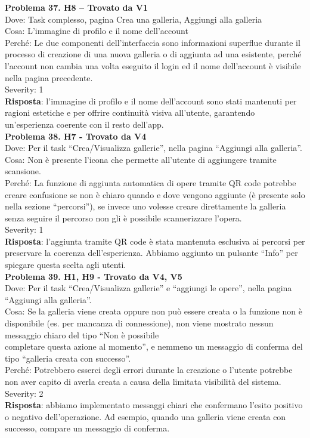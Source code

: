 \documentclass{article}
\begin{document}
\noindent \textbf{Problema 37. H8 – Trovato da V1} \\
Dove: Task complesso, pagina Crea una galleria, Aggiungi alla galleria \\
Cosa: L’immagine di profilo e il nome dell’account \\
Perché: Le due componenti dell’interfaccia sono informazioni superflue durante il processo di creazione di una nuova galleria o di aggiunta ad una esistente, perché l’account non cambia una volta eseguito il login ed il nome dell'account è visibile nella pagina precedente. \\
Severity: 1 \\
\textbf{Risposta}: l’immagine di profilo e il nome dell’account sono stati mantenuti per ragioni estetiche e per offrire continuità visiva all’utente, garantendo un’esperienza coerente con il resto dell’app.\\

\noindent \textbf{Problema 38. H7 - Trovato da V4} \\
Dove: Per il task “Crea/Visualizza gallerie”, nella pagina “Aggiungi alla galleria”. \\
Cosa: Non è presente l’icona che permette all’utente di aggiungere tramite scansione. \\
Perché: La funzione di aggiunta automatica di opere tramite QR code potrebbe creare confusione se non è chiaro quando e dove vengono aggiunte (è presente solo nella sezione “percorsi”), se invece uno volesse creare direttamente la galleria senza seguire il percorso non gli è possibile scannerizzare l’opera. \\
Severity: 1 \\
\textbf{Risposta}: l’aggiunta tramite QR code è stata mantenuta esclusiva ai percorsi per preservare la coerenza dell’esperienza. Abbiamo aggiunto un pulsante “Info” per spiegare questa scelta agli utenti. \\

\noindent \textbf{Problema 39. H1, H9 - Trovato da V4, V5} \\
Dove: Per il task “Crea/Visualizza gallerie” e “aggiungi le opere”, nella pagina “Aggiungi alla galleria”. \\
Cosa: Se la galleria viene creata oppure non può essere creata o la funzione non è disponibile (es. per mancanza di connessione), non viene mostrato nessun messaggio chiaro del tipo “Non è possibile \\ completare questa azione al momento”, e nemmeno un messaggio di conferma del tipo “galleria creata con successo”. \\
Perché: Potrebbero esserci degli errori durante la creazione o l’utente potrebbe non aver capito di averla creata a causa della limitata visibilità del sistema. \\
Severity: 2 \\
\textbf{Risposta}: abbiamo implementato messaggi chiari che confermano l’esito positivo o negativo dell’operazione. Ad esempio, quando una galleria viene creata con successo, compare un messaggio di conferma. \\
\end{document}
